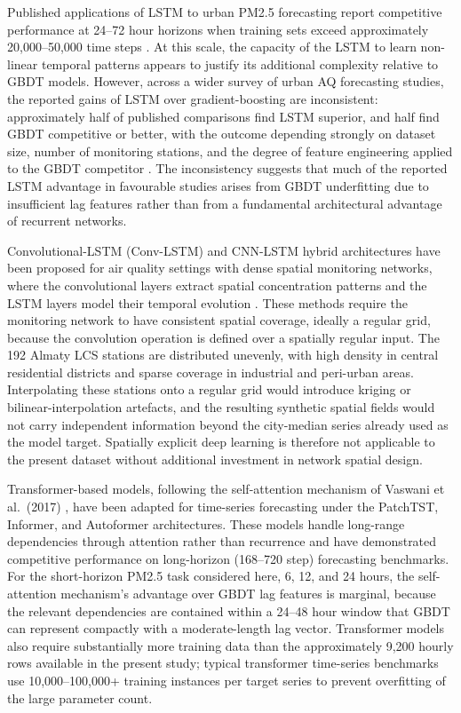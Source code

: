 Published applications of LSTM to urban PM2.5 forecasting report competitive performance at 24--72 hour horizons when training sets exceed approximately 20,000--50,000 time steps \cite{qi2019pm25lstm}. At this scale, the capacity of the LSTM to learn non-linear temporal patterns appears to justify its additional complexity relative to GBDT models. However, across a wider survey of urban AQ forecasting studies, the reported gains of LSTM over gradient-boosting are inconsistent: approximately half of published comparisons find LSTM superior, and half find GBDT competitive or better, with the outcome depending strongly on dataset size, number of monitoring stations, and the degree of feature engineering applied to the GBDT competitor \cite{lim2021survey}. The inconsistency suggests that much of the reported LSTM advantage in favourable studies arises from GBDT underfitting due to insufficient lag features rather than from a fundamental architectural advantage of recurrent networks.

Convolutional-LSTM (Conv-LSTM) and CNN-LSTM hybrid architectures have been proposed for air quality settings with dense spatial monitoring networks, where the convolutional layers extract spatial concentration patterns and the LSTM layers model their temporal evolution \cite{Ding2021}. These methods require the monitoring network to have consistent spatial coverage, ideally a regular grid, because the convolution operation is defined over a spatially regular input. The 192 Almaty LCS stations are distributed unevenly, with high density in central residential districts and sparse coverage in industrial and peri-urban areas. Interpolating these stations onto a regular grid would introduce kriging or bilinear-interpolation artefacts, and the resulting synthetic spatial fields would not carry independent information beyond the city-median series already used as the model target. Spatially explicit deep learning is therefore not applicable to the present dataset without additional investment in network spatial design.

Transformer-based models, following the self-attention mechanism of Vaswani et al.~(2017) \cite{vaswani2017attention}, have been adapted for time-series forecasting under the PatchTST, Informer, and Autoformer architectures. These models handle long-range dependencies through attention rather than recurrence and have demonstrated competitive performance on long-horizon (168--720 step) forecasting benchmarks. For the short-horizon PM2.5 task considered here, 6, 12, and 24 hours, the self-attention mechanism's advantage over GBDT lag features is marginal, because the relevant dependencies are contained within a 24--48 hour window that GBDT can represent compactly with a moderate-length lag vector. Transformer models also require substantially more training data than the approximately 9,200 hourly rows available in the present study; typical transformer time-series benchmarks use 10,000--100,000+ training instances per target series to prevent overfitting of the large parameter count.

